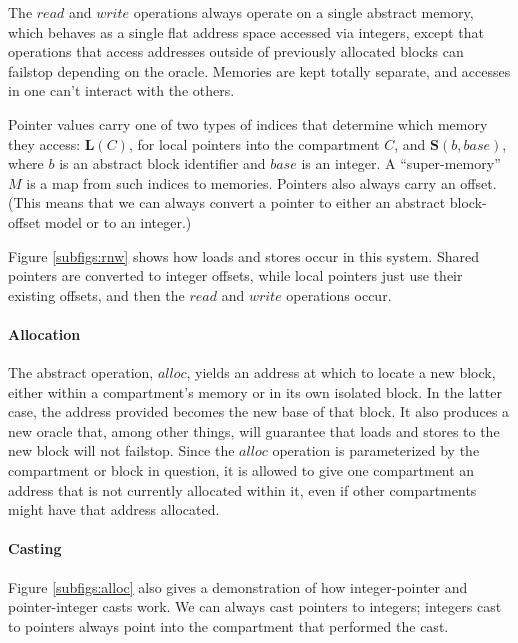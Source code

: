 \documentclass{article}
\begin{document}
The \(\mathit{read}\) and \(\mathit{write}\) operations always operate on a single
abstract memory, which behaves as a single flat address space accessed via integers,
except that operations that access addresses outside of previously allocated blocks
can failstop depending on the oracle. Memories are kept totally separate, and accesses
in one can't interact with the others.

Pointer values carry one of two types of indices that determine which memory they access:
\(\mathbf{L}(C)\), for local pointers into the compartment \(C\), and
\(\mathbf{S}(b,\mathit{base})\), where \(b\) is an abstract block identifier and
\(\mathit{base}\) is an integer. A ``super-memory'' \(M\) is a map from such indices
to memories. Pointers also always carry an offset. (This means that we can always convert a
pointer to either an abstract block-offset model or to an integer.)

Figure \ref{subfigs:rnw} shows how loads and stores occur in this system. Shared pointers
are converted to integer offsets, while local pointers just use their existing offsets,
and then the \(\mathit{read}\) and \(\mathit{write}\) operations occur.

\paragraph{Allocation}

The abstract operation, \(\mathit{alloc}\), yields an address at which to locate a new
block, either within a compartment's memory or in its own isolated block. In the latter
case, the address provided becomes the new base of that block. It also produces a new
oracle that, among other things, will guarantee that loads and stores to the new block will
not failstop. Since the \(\mathit{alloc}\) operation is parameterized by the compartment
or block in question, it is allowed to give one compartment an address that is not currently
allocated within it, even if other compartments might have that address allocated.

\paragraph{Casting}

Figure \ref{subfigs:alloc} also gives a demonstration of how integer-pointer and
pointer-integer casts work. We can always cast pointers to integers; integers cast to pointers
always point into the compartment that performed the cast.
\end{document}
